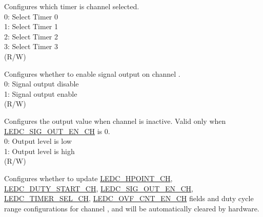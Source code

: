 %
%
%
%
%
%
%
%
\regnewline%
\begin{regdesc}\begin{reglist}
\label{fielddesc:LEDCTIMERSELCHN}\item [LEDC\_TIMER\_SEL\_CH\regindex{n}] Configures which timer is channel  selected.\\
0: Select Timer 0\\
1: Select Timer 1\\
2: Select Timer 2\\
3: Select Timer 3 \\(R/W)
\label{fielddesc:LEDCSIGOUTENCHN}\item [LEDC\_SIG\_OUT\_EN\_CH\regindex{n}] Configures whether to enable signal output on channel .\\
0: Signal output disable\\
1: Signal output enable \\
(R/W)
\label{fielddesc:LEDCIDLELVCHN}\item [LEDC\_IDLE\_LV\_CH\regindex{n}] Configures the output value when channel  is inactive. Valid only when \hyperref[fielddesc:LEDCSIGOUTENCHN]{LEDC\_SIG\_OUT\_EN\_CH} is 0.\\
0: Output level is low\\
1: Output level is high \\
(R/W)
\label{fielddesc:LEDCPARAUPCHN}\item [LEDC\_PARA\_UP\_CH\regindex{n}] Configures whether to update \hyperref[fielddesc:LEDCHPOINTCHN]{LEDC\_HPOINT\_CH}, \hyperref[fielddesc:LEDCDUTYSTARTCHN]{LEDC\_DUTY\_START\_CH}, \hyperref[fielddesc:LEDCSIGOUTENCHN]{LEDC\_SIG\_OUT\_EN\_CH}, \hyperref[fielddesc:LEDCTIMERSELCHN]{LEDC\_TIMER\_SEL\_CH}, \hyperref[fielddesc:LEDCOVFCNTENCHN]{LEDC\_OVF\_CNT\_EN\_CH} fields and duty cycle range configurations for channel , and will be automatically cleared by hardware.\\

\end{reglist}
\end{regdesc}
